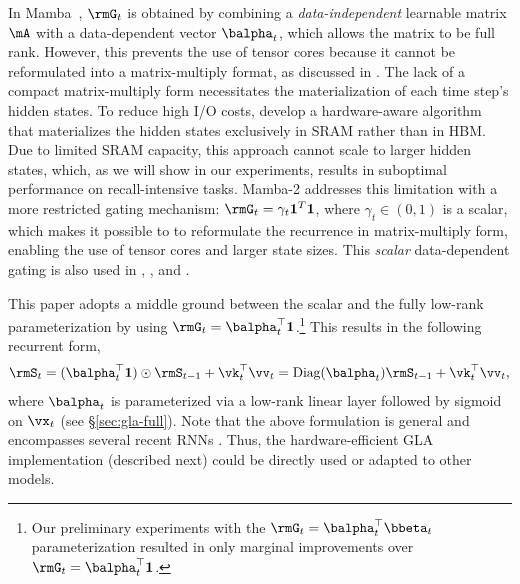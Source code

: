 In Mamba~\cite{Gu2023MambaLS}, \(\rmG_t\) is obtained by combining a  \emph{data-independent} learnable matrix \(\mA\) with a data-dependent vector $\balpha_t$, which allows the matrix to be full rank. However, this prevents the use of tensor cores because it cannot be reformulated into a matrix-multiply format, as discussed in  \citet{mamba2}. The lack of a compact matrix-multiply form  necessitates the materialization of each time step's hidden states. To reduce high I/O costs, \citet{Gu2023MambaLS} develop a hardware-aware algorithm that materializes the hidden states {exclusively} in  SRAM rather than in HBM. Due to limited SRAM capacity, this approach cannot scale to larger hidden states, which, as we will show in our experiments, results in suboptimal performance on recall-intensive tasks. Mamba-2 \cite{mamba2} addresses this limitation with a more {restricted} gating mechanism: \(\rmG_t = \gamma_t \mathbf{1}^T \mathbf{1}\), where \(\gamma_t \in (0,1)\) is a scalar, which makes it possible to to reformulate the recurrence in matrix-multiply form, enabling the use of tensor cores and larger  state sizes. This \emph{scalar} data-dependent gating is also used in \citet{peng2021random}, \citet{Sun2024YouOC}, and \citet{beck2024xlstm}. 

 

 
 This paper adopts a middle ground between the scalar and the fully low-rank parameterization by using $\rmG_{t} = \balpha_t ^\top \mathbf{1}$.\footnote{Our preliminary experiments with the $\rmG_t = \balpha_t^\top \bbeta_t$ parameterization resulted in only marginal improvements over $\rmG_{t} = \balpha_t ^\top \mathbf{1}$.}
This results in the following recurrent form,
\begin{align}
\rmS_t =  (\balpha_t^{\top} \mathbf{1}) \odot \rmS_{t-1} + \vk_t^{\top} \vv_t = \text{Diag}(\balpha_t)  \rmS_{t-1} + \vk_t^{\top} \vv_t, 
\label{eq:gla-simple}
\end{align}
where $\balpha_t$ is parameterized via a low-rank linear layer followed by sigmoid on $\vx_t$ (see \S\ref{sec:gla-full}). Note that the above formulation 
 is general and  encompasses several recent RNNs \cite{gatedloop, qin2024hgrn2, peng2024eagle}. Thus, the hardware-efficient GLA implementation (described next) could be directly used or adapted to other models. 

\vspace{-2mm}
